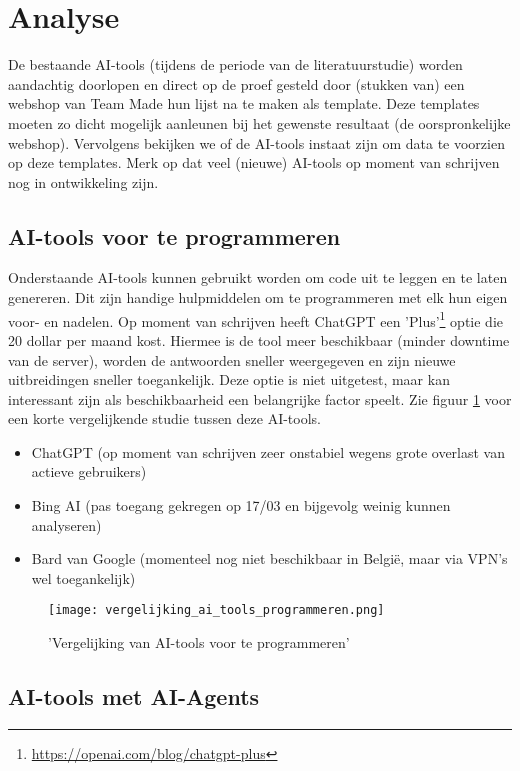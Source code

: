 \section{Analyse}
De bestaande AI-tools (tijdens de periode van de literatuurstudie) worden aandachtig doorlopen en direct op de proef gesteld door (stukken van) een webshop van Team Made hun lijst na te maken als template. Deze templates moeten zo dicht mogelijk aanleunen bij het gewenste resultaat (de oorspronkelijke webshop). Vervolgens bekijken we of de AI-tools instaat zijn om data te voorzien op deze templates. Merk op dat veel (nieuwe) AI-tools op moment van schrijven nog in ontwikkeling zijn.
\label{ai_tools_programmeren}\subsection{AI-tools voor te programmeren}
Onderstaande AI-tools kunnen gebruikt worden om code uit te leggen en te laten genereren. Dit zijn handige hulpmiddelen om te programmeren met elk hun eigen voor- en nadelen. Op moment van schrijven heeft ChatGPT een 'Plus'\footnote{\href{https://openai.com/blog/chatgpt-plus}{https://openai.com/blog/chatgpt-plus}} optie die 20 dollar per maand kost. Hiermee is de tool meer beschikbaar (minder downtime van de server), worden de antwoorden sneller weergegeven en zijn nieuwe uitbreidingen sneller toegankelijk. Deze optie is niet uitgetest, maar kan interessant zijn als beschikbaarheid een belangrijke factor speelt. Zie figuur \ref{vergelijking_ai_tools_programmeren} voor een korte vergelijkende studie tussen deze AI-tools.  
\begin{itemize}
    \item ChatGPT (op moment van schrijven zeer onstabiel wegens grote overlast van actieve gebruikers)
    \item Bing AI (pas toegang gekregen op 17/03 en bijgevolg weinig kunnen analyseren)
    \item Bard van Google (momenteel nog niet beschikbaar in België, maar via VPN's wel toegankelijk)
\end{itemize}
\begin{figure}
    \caption{'Vergelijking van AI-tools voor te programmeren'}
    \label{vergelijking_ai_tools_programmeren}
    \centering
    \texttt{[image: vergelijking\_ai\_tools\_programmeren.png]}
\end{figure}
\label{ai_tools_agents}\subsection{AI-tools met AI-Agents}
